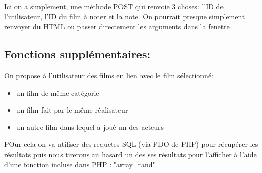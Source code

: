 \documentclass[a4paper, 11pt]{MyReport}
\begin{document}
					Ici on a simplement, une méthode POST qui renvoie 3 choses: l'ID de l'utilisateur, l'ID du film à noter et la note. On pourrait presque simplement renvoyer du HTML ou passer directement les arguments dans la fenetre


			\subsection{Fonctions supplémentaires:}

				On propose à l'utilisateur des films en lien avec le film sélectionné:
				\begin{itemize}
					\item un film de même catégorie
					\item un film fait par le même réalisateur
					\item un autre film dans lequel a joué un des acteurs
				\end{itemize}

				POur cela on va utiliser des requetes SQL (via PDO de PHP) pour récupérer les résultats puis nous tirerons au hasard un des ses résultats pour l'afficher à l'aide d'une fonction incluse dans PHP : "array\_rand"



\end{document}
